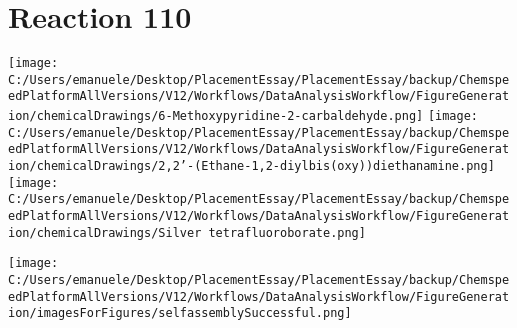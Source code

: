 \documentclass{article}%
\begin{document}
\section*{Reaction 110}%
%
\begin{scheme}[H]%
\begin{minipage}{0.5\textwidth}%
\texttt{[image: C:/Users/emanuele/Desktop/PlacementEssay/PlacementEssay/backup/ChemspeedPlatformAllVersions/V12/Workflows/DataAnalysisWorkflow/FigureGeneration/chemicalDrawings/6-Methoxypyridine-2-carbaldehyde.png]}%
\texttt{[image: C:/Users/emanuele/Desktop/PlacementEssay/PlacementEssay/backup/ChemspeedPlatformAllVersions/V12/Workflows/DataAnalysisWorkflow/FigureGeneration/chemicalDrawings/2,2'-(Ethane-1,2-diylbis(oxy))diethanamine.png]}%
\texttt{[image: C:/Users/emanuele/Desktop/PlacementEssay/PlacementEssay/backup/ChemspeedPlatformAllVersions/V12/Workflows/DataAnalysisWorkflow/FigureGeneration/chemicalDrawings/Silver tetrafluoroborate.png]}%
\end{minipage}%
\begin{minipage}{0.5\textwidth}%
\begin{center}%
\texttt{[image: C:/Users/emanuele/Desktop/PlacementEssay/PlacementEssay/backup/ChemspeedPlatformAllVersions/V12/Workflows/DataAnalysisWorkflow/FigureGeneration/imagesForFigures/selfassemblySuccessful.png]}%
\end{center}%
\end{minipage}%
\caption{Self-assembly of components 6, 19, with Silver(I) in a 3.0:1.5:1.0 molar ratio in CH$_3$CN at 60\textdegree C for 40h. These are the reagents (starting materials) for reaction 110.}%
\end{scheme}%
\end{document}
